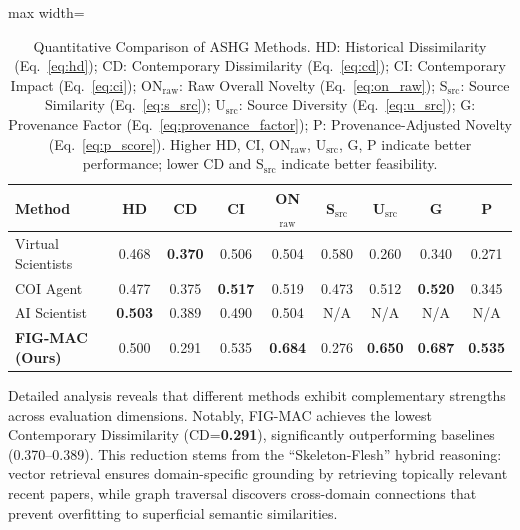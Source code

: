 \documentclass[runningheads]{llncs}
\begin{document}
\begin{table}[t]
\centering
\small
\caption{Quantitative Comparison of ASHG Methods. HD: Historical Dissimilarity (Eq.~\ref{eq:hd}); CD: Contemporary Dissimilarity (Eq.~\ref{eq:cd}); CI: Contemporary Impact (Eq.~\ref{eq:ci}); ON$_{\text{raw}}$: Raw Overall Novelty (Eq.~\ref{eq:on_raw}); S$_{\text{src}}$: Source Similarity (Eq.~\ref{eq:s_src}); U$_{\text{src}}$: Source Diversity (Eq.~\ref{eq:u_src}); G: Provenance Factor (Eq.~\ref{eq:provenance_factor}); P: Provenance-Adjusted Novelty (Eq.~\ref{eq:p_score}). Higher HD, CI, ON$_{\text{raw}}$, U$_{\text{src}}$, G, P indicate better performance; lower CD and S$_{\text{src}}$ indicate better feasibility.}
\label{tab:main_results}
\setlength{\tabcolsep}{2pt}
\begin{adjustbox}{max width=\textwidth}
\begin{tabular}{lcccccccc}
\toprule
\textbf{Method} & \textbf{HD} & \textbf{CD} & \textbf{CI} & \textbf{ON$_{\text{raw}}$} & \textbf{S$_{\text{src}}$} & \textbf{U$_{\text{src}}$} & \textbf{G} & \textbf{P} \\
\midrule
Virtual Scientists & 0.468 & \textbf{0.370} & 0.506 & 0.504 & 0.580 & 0.260 & 0.340 & 0.271 \\
COI Agent & 0.477 & 0.375 & \textbf{0.517} & 0.519 & 0.473 & 0.512 & \textbf{0.520} & 0.345 \\
AI Scientist & \textbf{0.503} & 0.389 & 0.490 & 0.504 & N/A & N/A & N/A & N/A \\
\midrule
\textbf{FIG-MAC (Ours)} & 0.500 & 0.291 & 0.535 & \textbf{0.684} & 0.276 & \textbf{0.650} & \textbf{0.687} & \textbf{0.535} \\
\bottomrule
\end{tabular}
\end{adjustbox}
\end{table}

Detailed analysis reveals that different methods exhibit complementary strengths across evaluation dimensions. Notably, FIG-MAC achieves the lowest Contemporary Dissimilarity (CD=\textbf{0.291}), significantly outperforming baselines (0.370--0.389). This reduction stems from the ``Skeleton-Flesh'' hybrid reasoning: vector retrieval ensures domain-specific grounding by retrieving topically relevant recent papers, while graph traversal discovers cross-domain connections that prevent overfitting to superficial semantic similarities.
\end{document}
